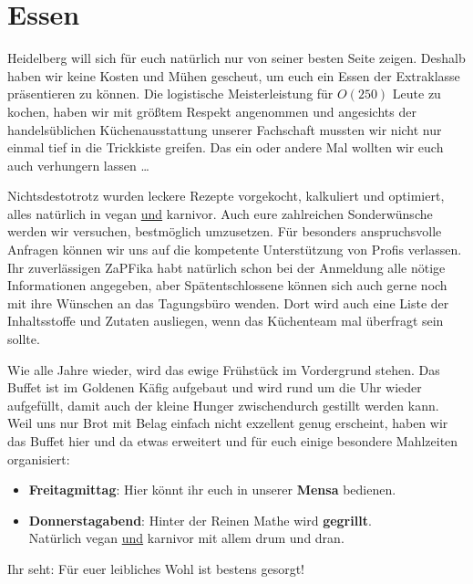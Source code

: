 
\section{Essen}
Heidelberg will sich für euch natürlich nur von seiner besten Seite zeigen. Deshalb haben wir keine Kosten und Mühen gescheut,  um euch ein Essen der Extraklasse präsentieren zu können. Die logistische Meisterleistung für $O(250)$ Leute zu kochen, haben wir mit größtem Respekt angenommen und angesichts der handelsüblichen Küchenausstattung unserer Fachschaft mussten wir nicht nur einmal tief in die Trickkiste greifen. Das ein oder andere Mal wollten wir euch auch verhungern lassen \dots

Nichtsdestotrotz wurden leckere Rezepte vorgekocht, kalkuliert und optimiert, alles natürlich in vegan \underline{und} karnivor.  Auch eure zahlreichen Sonderwünsche werden wir versuchen, bestmöglich umzusetzen. Für besonders anspruchsvolle Anfragen können wir uns auf die kompetente Unterstützung von Profis verlassen. Ihr zuverlässigen ZaPFika habt natürlich schon bei der Anmeldung alle nötige Informationen angegeben, aber Spätentschlossene können sich auch gerne noch mit ihre Wünschen an das Tagungsbüro wenden. Dort wird auch eine Liste der Inhaltsstoffe und Zutaten ausliegen, wenn das Küchenteam mal überfragt sein sollte.

Wie alle Jahre wieder, wird das ewige Frühstück im Vordergrund stehen. Das Buffet ist im Goldenen Käfig aufgebaut und wird rund um die Uhr wieder aufgefüllt, damit auch der kleine Hunger zwischendurch gestillt werden kann. Weil uns nur Brot mit Belag einfach nicht exzellent genug erscheint, haben wir das Buffet hier und da etwas erweitert und für euch einige besondere Mahlzeiten organisiert:
  \begin{itemize}
    \item \textbf{Freitagmittag}: Hier könnt ihr euch in unserer \textbf{Mensa} bedienen.
    \item \textbf{Donnerstagabend}: Hinter der Reinen Mathe wird \textbf{gegrillt}. \\
      Natürlich vegan \underline{und} karnivor mit allem drum und dran.
  \end{itemize}
  Ihr seht: Für euer leibliches Wohl ist bestens gesorgt! \\

